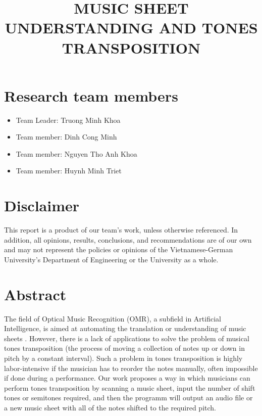 \documentclass[a4paper,12pt]{report}
\title{ MUSIC SHEET UNDERSTANDING AND TONES TRANSPOSITION}
\author{}
\begin{document}
\afterpage{\null\newpage}

\maketitle

\tableofcontents

\clearpage

\section{Research team members}
\begin{itemize}
	\item Team Leader:      \hfill Truong Minh Khoa
	\item Team member: 		\hfill Dinh Cong Minh
	\item Team member:		\hfill Nguyen Tho Anh Khoa
	\item Team member:	    \hfill Huynh Minh Triet
\end{itemize}


\section{Disclaimer} 
This report is a product of our team's work, unless otherwise referenced. In
addition, all opinions, results, conclusions, and recommendations are of our own
and may not represent the policies or opinions of the Vietnamese-German
University's Department of Engineering or the University as a whole. 

\clearpage

\section{Abstract} 

The field of Optical Music Recognition (OMR), a subfield in Artificial
Intelligence, is aimed at automating the translation or understanding of music
sheets \cite{Calvo-Zaragoza}.  However, there is a lack of applications to solve
the problem of musical tones transposition (the process of moving a collection
of notes up or down in pitch by a constant interval).  Such a problem in tones
transposition is highly labor-intensive if the musician has to reorder the notes
manually, often impossible if done during a performance. Our work proposes a way
in which musicians can perform tones transposition by scanning a music sheet,
input the number of shift tones or semitones required, and then the programm
will output an audio file or a new music sheet with all of the notes shifted to
the required pitch. 
\end{document}
